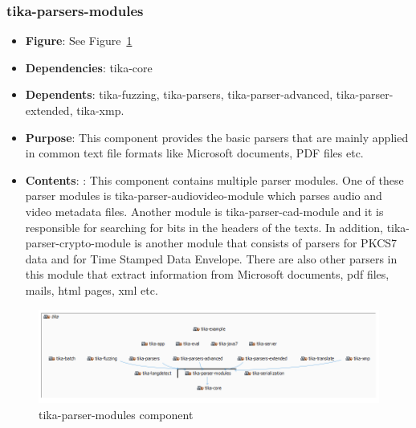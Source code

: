 \documentclass{article}
\begin{document}
\subsubsection{tika-parsers-modules}
\begin {itemize}
\item \textbf{Figure}: See Figure~\ref{fig:tika-parser-modules}
\item \textbf{Dependencies}: tika-core
\item \textbf{Dependents}: tika-fuzzing, tika-parsers, tika-parser-advanced, tika-parser-extended, tika-xmp.
\item \textbf{Purpose}: This component provides the basic parsers that are mainly applied in common text file formats like Microsoft documents, PDF files etc. 
\item \textbf{Contents}: : This component contains multiple parser modules. One of these parser modules is tika-parser-audiovideo-module which parses audio and video metadata files. Another module is tika-parser-cad-module and it is responsible for searching for bits in the headers of the texts. In addition, tika-parser-crypto-module is another module that consists of parsers for PKCS7 data and for Time Stamped Data Envelope. There are also other parsers in this module that extract information from Microsoft documents, pdf files, mails, html pages, xml etc. 
\end{itemize}
\begin{figure}[h!]
    \centering
    \includegraphics[width=1\textwidth]{report/images/tikamodules.PNG}
    \caption{tika-parser-modules component}
    \label{fig:tika-parser-modules}
\end{figure}
\end{document}
